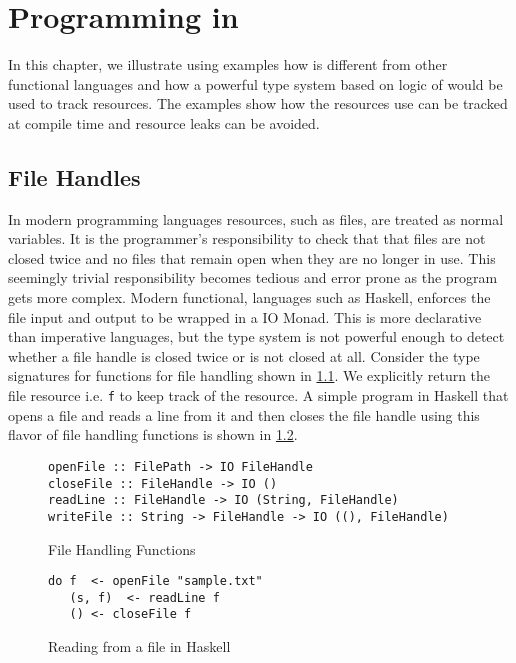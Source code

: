 \chapter{Programming in \qub{}}\label{chp:qub-programming}

In this chapter, we illustrate using examples how \qub{} is different
from other functional languages and how a powerful type system based on logic of \BI{}
would be used to track resources. The examples show how the resources use
can be tracked at compile time and resource leaks can be avoided.

\section{File Handles}\label{sec:file-handle-example}

In modern programming languages resources, such as files, are treated as normal variables.
It is the programmer's responsibility to check that that files are not closed twice
and no files that remain open when they are no longer in use. This seemingly trivial
responsibility becomes tedious and error prone as the program gets more complex.
Modern functional, languages such as Haskell, enforces the file input and output to be wrapped in a IO Monad.
This is more declarative than imperative languages, but the type system is not powerful enough
to detect whether a file handle is closed twice or is not closed at all.
Consider the type signatures for functions for file handling shown in \cref{fig:file-handling-function}. We explicitly
return the file resource i.e. \texttt{f} to keep track of the resource.
A simple program in Haskell that opens a file and reads a line from it and then closes the file handle using this
flavor of file handling functions is shown in \cref{fig:file-read-close}.

\begin{figure}[h]
  \begin{framed}
    \begin{verbatim}
openFile :: FilePath -> IO FileHandle
closeFile :: FileHandle -> IO ()
readLine :: FileHandle -> IO (String, FileHandle)
writeFile :: String -> FileHandle -> IO ((), FileHandle)
    \end{verbatim}
  \end{framed}
  \caption{File Handling Functions}
  \label{fig:file-handling-function}
\end{figure}

\begin{figure}[h]
  \begin{framed}
    \begin{verbatim}
do f  <- openFile "sample.txt"
   (s, f)  <- readLine f
   () <- closeFile f
    \end{verbatim}
  \end{framed}
  \caption{Reading from a file in Haskell}
  \label{fig:file-read-close}
\end{figure}

